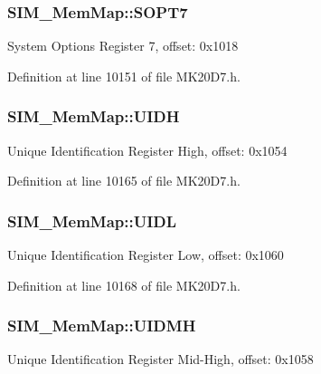 \subsubsection[{\texorpdfstring{S\+O\+P\+T7}{SOPT7}}]{ S\+I\+M\+\_\+\+Mem\+Map\+::\+S\+O\+P\+T7}\hypertarget{struct_s_i_m___mem_map_a04a22056fd7d08179705d29cda1b9e2a}{}\label{struct_s_i_m___mem_map_a04a22056fd7d08179705d29cda1b9e2a}
System Options Register 7, offset\+: 0x1018 

Definition at line 10151 of file M\+K20\+D7.\+h.

\subsubsection[{\texorpdfstring{U\+I\+DH}{UIDH}}]{ S\+I\+M\+\_\+\+Mem\+Map\+::\+U\+I\+DH}\hypertarget{struct_s_i_m___mem_map_a28fe54037c53da17fa24c0b361dbdfa3}{}\label{struct_s_i_m___mem_map_a28fe54037c53da17fa24c0b361dbdfa3}
Unique Identification Register High, offset\+: 0x1054 

Definition at line 10165 of file M\+K20\+D7.\+h.

\subsubsection[{\texorpdfstring{U\+I\+DL}{UIDL}}]{ S\+I\+M\+\_\+\+Mem\+Map\+::\+U\+I\+DL}\hypertarget{struct_s_i_m___mem_map_ac23a694afa8d84e55fc43ff0c0ec1b29}{}\label{struct_s_i_m___mem_map_ac23a694afa8d84e55fc43ff0c0ec1b29}
Unique Identification Register Low, offset\+: 0x1060 

Definition at line 10168 of file M\+K20\+D7.\+h.

\subsubsection[{\texorpdfstring{U\+I\+D\+MH}{UIDMH}}]{ S\+I\+M\+\_\+\+Mem\+Map\+::\+U\+I\+D\+MH}\hypertarget{struct_s_i_m___mem_map_af4fb6d5bc3fa71f9c905570d87a2e93f}{}\label{struct_s_i_m___mem_map_af4fb6d5bc3fa71f9c905570d87a2e93f}
Unique Identification Register Mid-\/\+High, offset\+: 0x1058 

